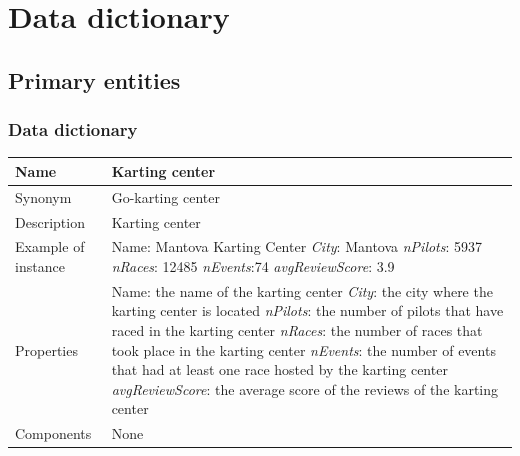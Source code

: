 \documentclass{beamer}
\begin{document}



\section*{Data dictionary}

\subsection*{Primary entities}

\begin{frame}
\frametitle{Data dictionary}


\begin{table}
\tiny
\begin{tabular}{|p{2cm}|p{6cm}|}
\hline
Name & \textbf{Karting center} \\
\hline
Synonym & Go-karting center \\
\hline
Description & Karting center \\
\hline
Example of instance & 
Name: Mantova Karting Center \newline
\textit{City}: Mantova \newline
\textit{nPilots}: 5937 \newline
\textit{nRaces}: 12485 \newline
\textit{nEvents}:74 \newline
\textit{avgReviewScore}: 3.9 \\
\hline
Properties & 
Name: the name of the karting center\newline
\textit{City}: the city where the karting center is located\newline
\textit{nPilots}: the number of pilots that have raced in the karting center \newline
\textit{nRaces}: the number of races that took place in the karting center \newline
\textit{nEvents}: the number of events that had at least one race hosted by the karting center \newline
\textit{avgReviewScore}: the average score of the reviews of the karting center \\
\hline
Components & None \\
\hline
\end{tabular}
\end{table}

\end{frame}
\end{document}
